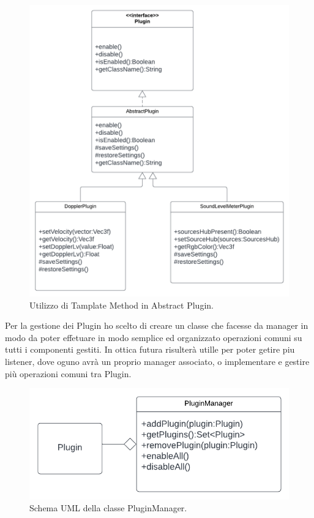 \documentclass[a4paper,12pt]{report}
\begin{document}
\begin{figure}[H]
\centering{}
\includegraphics[width=\textwidth]{img/listener/Plugin.png}
\caption{Utilizzo di Tamplate Method in Abstract Plugin.}
\label{img:Listener}
\end{figure}
%
Per la gestione dei Plugin ho scelto di creare un classe che facesse da manager in modo da poter effetuare in modo semplice ed organizzato operazioni comuni su tutti i componenti gestiti. In ottica futura risulterà utille per poter getire piu listener, dove oguno avrà un proprio manager associato, o implementare e  gestire più operazioni comuni tra Plugin.
\begin{figure}[H]
\centering{}
\includegraphics[width=\textwidth]{img/listener/PluginManager.png}
\caption{Schema UML della classe PluginManager.}
\label{img:Listener}
\end{figure}
\end{document}
